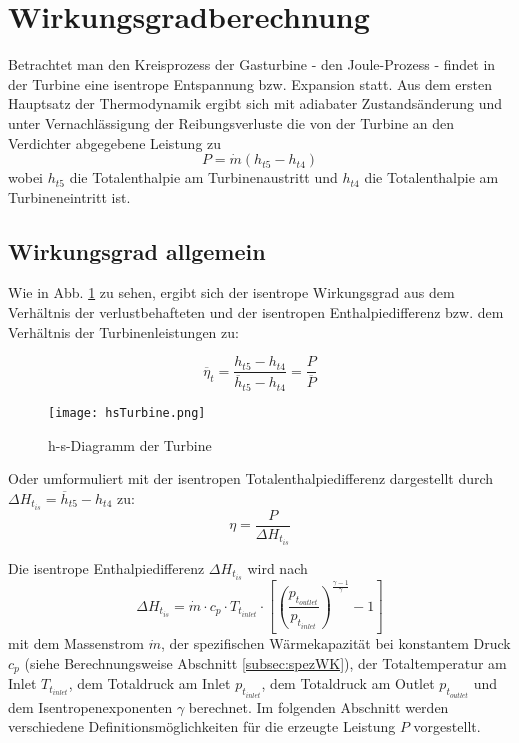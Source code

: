 \section{Wirkungsgradberechnung}
\label{cha:wgberechnung}
Betrachtet man den Kreisprozess der Gasturbine - den Joule-Prozess - findet in der Turbine eine isentrope Entspannung bzw. Expansion statt. Aus dem ersten Hauptsatz der Thermodynamik ergibt sich mit adiabater Zustandsänderung und unter Vernachlässigung der Reibungsverluste die von der Turbine an den Verdichter abgegebene Leistung zu
\begin{equation}
\label{eq:leistungTurbine}
P = \dot m (h_{t5} - h_{t4})
\end{equation}
wobei $h_{t5}$ die Totalenthalpie am Turbinenaustritt und $h_{t4}$ die Totalenthalpie am Turbineneintritt ist. 



\subsection{Wirkungsgrad allgemein}

Wie in Abb. \ref{fig:hsTurbine} zu sehen, ergibt sich der isentrope Wirkungsgrad aus dem Verhältnis der verlustbehafteten und der isentropen Enthalpiedifferenz bzw. dem Verhältnis der Turbinenleistungen zu:

\begin{equation}
\label{eq:leistungTurbine}
\overline{\eta}_{t} = \frac{h_{t5} - h_{t4}}{\overline{h}_{t5} - h_{t4}} =  \frac{P}{ \overline{P}} 
\end{equation}

\begin{figure}[htbp]
	\centering
	\texttt{[image: hsTurbine.png]}
	\caption{h-s-Diagramm der Turbine} \label{fig:hsTurbine}
	
\end{figure} 

Oder umformuliert mit der isentropen Totalenthalpiedifferenz dargestellt durch $\Delta H_{t_{is}} = \overline{h}_{t5} - h_{t4}$ zu:
\begin{equation}
\label{eq:wgallgemein}
\eta =\frac{P}{\Delta H_{t_{is}}}
\end{equation}

Die isentrope Enthalpiedifferenz $\Delta H_{t_{is}}$ wird nach
\begin{equation}
\label{eq:wgnenner}
\Delta H_{t_{is}} = \dot m \cdot c_p \cdot T_{t_{inlet}} \cdot \left[ \left( \frac{p_{t_{outlet}}}{p_{t_{inlet}}}\right)^\frac{\gamma-1}{\gamma}-1\right]
\end{equation}
mit dem Massenstrom $\dot m$, der spezifischen Wärmekapazität bei konstantem Druck $c_p$ (siehe Berechnungsweise Abschnitt \ref{subsec:spezWK}), der Totaltemperatur am Inlet $T_{t_{inlet}}$, dem Totaldruck am Inlet $p_{t_{inlet}}$, dem Totaldruck am Outlet $p_{t_{outlet}}$ und dem Isentropenexponenten $\gamma$ berechnet.\newline 
Im folgenden Abschnitt werden verschiedene Definitionsmöglichkeiten für die erzeugte Leistung $P$ vorgestellt.
